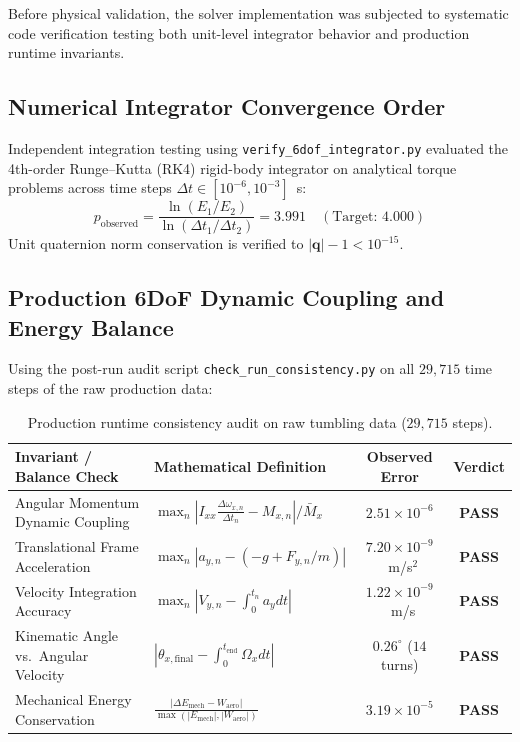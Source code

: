 \documentclass[11pt,a4paper]{article}
\begin{document}
Before physical validation, the solver implementation was subjected to systematic code verification testing both unit-level integrator behavior and production runtime invariants.

\subsection{Numerical Integrator Convergence Order}
Independent integration testing using \texttt{verify\_6dof\_integrator.py} evaluated the 4th-order Runge--Kutta (RK4) rigid-body integrator on analytical torque problems across time steps $\Delta t \in [10^{-6}, 10^{-3}]$~s:
\begin{equation}
p_{\mathrm{observed}} = \frac{\ln(E_1 / E_2)}{\ln(\Delta t_1 / \Delta t_2)} = 3.991 \quad (\text{Target: } 4.000)
\end{equation}
Unit quaternion norm conservation is verified to $|\mathbf{q}| - 1 < 10^{-15}$.

\subsection{Production 6DoF Dynamic Coupling and Energy Balance}
Using the post-run audit script \texttt{check\_run\_consistency.py} on all $29,715$ time steps of the raw production data:
\begin{table}[H]
\centering
\small
\begin{tabularx}{\textwidth}{l X c c}
\toprule
\textbf{Invariant / Balance Check} & \textbf{Mathematical Definition} & \textbf{Observed Error} & \textbf{Verdict} \\
\midrule
Angular Momentum Dynamic Coupling & $\max_n \left| I_{xx} \frac{\Delta\omega_{x,n}}{\Delta t_n} - M_{x,n} \right| / \bar{M}_x$ & $2.51 \times 10^{-6}$ & \textbf{PASS} \\
Translational Frame Acceleration & $\max_n \left| a_{y,n} - (-g + F_{y,n}/m) \right|$ & $7.20 \times 10^{-9}$~m/s$^2$ & \textbf{PASS} \\
Velocity Integration Accuracy & $\max_n \left| V_{y,n} - \int_0^{t_n} a_y dt \right|$ & $1.22 \times 10^{-9}$~m/s & \textbf{PASS} \\
Kinematic Angle vs.\ Angular Velocity & $\left| \theta_{x,\mathrm{final}} - \int_0^{t_{\mathrm{end}}} \Omega_x dt \right|$ & $0.26^\circ$ ($14$ turns) & \textbf{PASS} \\
Mechanical Energy Conservation & $\frac{\left| \Delta E_{\mathrm{mech}} - W_{\mathrm{aero}} \right|}{\max(|E_{\mathrm{mech}}|, |W_{\mathrm{aero}}|)}$ & $3.19 \times 10^{-5}$ & \textbf{PASS} \\
\bottomrule
\end{tabularx}
\caption{Production runtime consistency audit on raw tumbling data ($29,715$ steps).}
\label{tab:consistency_audit}
\end{table}
\end{document}
